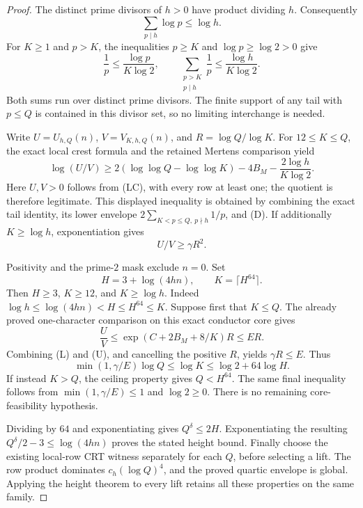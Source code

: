 \documentclass[11pt]{article}
\begin{document}
\begin{proof}
The distinct prime divisors of \(h>0\) have product dividing \(h\).
Consequently
\[
                    \sum_{p\mid h}\log p\leq\log h.
\]
For \(K\geq1\) and \(p>K\), the inequalities \(p\geq K\) and
\(\log p\geq\log2>0\) give
\[
 \frac1p\leq\frac{\log p}{K\log2},\qquad
 \sum_{\substack{p>K\\p\mid h}}\frac1p
                    \leq\frac{\log h}{K\log2}.
 \tag{D}
\]
Both sums run over distinct prime divisors. The finite support of any
tail with \(p\leq Q\) is contained in this divisor set, so no limiting
interchange is needed.

Write \(U=U_{h,Q}(n)\), \(V=V_{K,h,Q}(n)\), and
\(R=\log Q/\log K\). For \(12\leq K\leq Q\), the exact local crest
formula and the retained Mertens comparison yield
\[
 \log(U/V)\geq
  2(\log\log Q-\log\log K)-4B_M
       -\frac{2\log h}{K\log2}.
\]
Here \(U,V>0\) follows from (LC), with every row at least one;
the quotient is therefore legitimate. This displayed inequality is
obtained by combining the exact tail identity, its lower envelope
\(2\sum_{K<p\leq Q,\ p\nmid h}1/p\), and (D).
If additionally \(K\geq\log h\), exponentiation gives
\[
                              U/V\geq\gamma R^2.
 \tag{L}
\]

Positivity and the prime-\(2\) mask exclude \(n=0\). Set
\[
                 H=3+\log(4hn),\qquad K=\lceil H^{64}\rceil.
\]
Then \(H\geq3\), \(K\geq12\), and \(K\geq\log h\). Indeed
\(\log h\leq\log(4hn)<H\leq H^{64}\leq K\).
Suppose first that \(K\leq Q\). The already proved one-character
comparison on this exact conductor core gives
\[
 \frac UV\leq
 \exp(C+2B_M+8/K)R\leq ER.
 \tag{U}
\]
Combining (L) and (U), and cancelling the positive \(R\), yields
\(\gamma R\leq E\). Thus
\[
 \min(1,\gamma/E)\log Q\leq\log K
                         \leq\log2+64\log H.
\]
If instead \(K>Q\), the ceiling property gives \(Q<H^{64}\).
The same final inequality follows from
\(\min(1,\gamma/E)\leq1\) and \(\log2\geq0\).
There is no remaining core-feasibility hypothesis.

Dividing by \(64\) and exponentiating gives \(Q^\delta\leq2H\).
Exponentiating the resulting
\(Q^\delta/2-3\leq\log(4hn)\) proves the stated height bound.
Finally choose the existing local-row CRT witness separately for each
\(Q\), before selecting a lift. The row product dominates
\(c_h(\log Q)^4\), and the proved quartic envelope is global.
Applying the height theorem to every lift retains all these properties
on the same family.
\end{proof}
\end{document}
